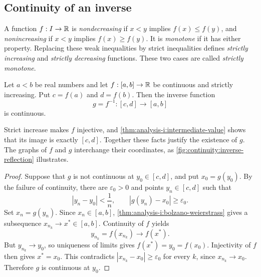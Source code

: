 


\subsection{Continuity of an inverse}


\begin{definition}
  \label{thm:analysis-i:monotone-functions}
  A function $f:I\to\mathbb{R}$ is \emph{nondecreasing} if $x<y$ implies
  $f(x)\le f(y)$, and \emph{nonincreasing} if $x<y$ implies
  $f(x)\ge f(y)$. It is \emph{monotone} if it has either property.
  Replacing these weak inequalities by strict inequalities defines
  \emph{strictly increasing} and \emph{strictly decreasing} functions.
  These two cases are called \emph{strictly monotone}.
\end{definition}


\begin{theorem}
  \label{thm:analysis-i:continuous-inverse}
  Let $a<b$ be real numbers and let $f:[a,b]\to\mathbb{R}$ be continuous and
  strictly increasing. Put $c=f(a)$ and $d=f(b)$.
  Then the inverse function
  \[
    g=f^{-1}:[c,d]\longrightarrow[a,b]
  \]
  is continuous.
\end{theorem}


  Strict increase makes $f$ injective, and
  \autoref{thm:analysis-i:intermediate-value} shows that its image is
  exactly $[c,d]$. Together these facts justify the existence of $g$.
  The graphs of $f$ and $g$ interchange their coordinates, as
  \autoref{fig:continuity:inverse-reflection} illustrates.

\begin{marginfigure}
  \centering
  
  \caption[Reflecting a function to obtain its inverse.]{The
    graphs of $y=x^2$ and $y=\sqrt{x}$ for nonnegative inputs are
    reflections in $y=x$. A point $(u,v)$ on one graph corresponds to
    $(v,u)$ on the other.}
  \label{fig:continuity:inverse-reflection}
\end{marginfigure}

\begin{proof}
  Suppose that $g$ is not continuous at $y_0\in[c,d]$, and put
  $x_0=g(y_0)$.
  By the failure of continuity, there are
    $\varepsilon_0>0$ and points $y_n\in[c,d]$ such that
  \[
    |y_n-y_0|<\frac1n,\qquad
      |g(y_n)-x_0|\ge\varepsilon_0.
  \]
  Set $x_n=g(y_n)$. Since $x_n\in[a,b]$,
  \autoref{thm:analysis-i:bolzano-weierstrass} gives a subsequence
  $x_{n_k}\to x^*\in[a,b]$. Continuity of $f$ yields
  \[
    y_{n_k}=f(x_{n_k})\longrightarrow f(x^*).
  \]
  But $y_{n_k}\to y_0$, so uniqueness of limits gives
  $f(x^*)=y_0=f(x_0)$. Injectivity of $f$ then gives $x^*=x_0$.
  This contradicts
    $|x_{n_k}-x_0|\ge\varepsilon_0$ for every $k$, since
    $x_{n_k}\to x_0$. Therefore $g$ is continuous at $y_0$.
\end{proof}


